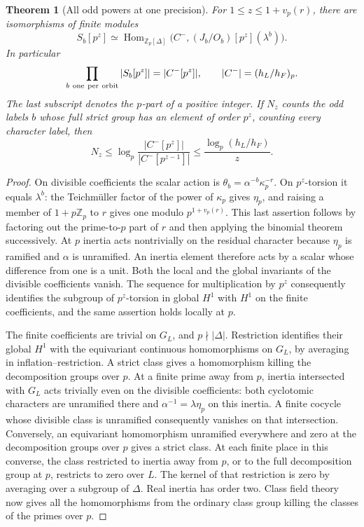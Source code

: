 \documentclass[a4paper,11pt]{article}
\newtheorem{theorem}[proposition]{Theorem}
\theoremstyle{definition}
\theoremstyle{remark}
\newcommand{\ZZ}{\mathbb Z}\newcommand{\ord}{\operatorname{ord}}
\numberwithin{equation}{section}
\begin{document}
\begin{theorem}[All odd powers at one precision]
\leavevmode\label{thm:halfclassdigits643}
For \(1\le z\le1+v_p(r)\), there are isomorphisms of finite
modules
\[
 S_b[p^z]\simeq
  \operatorname{Hom}_{\ZZ_p[\Delta]}
       \bigl(C^-,(J_b/O_b)[p^z](\lambda^b)\bigr).
\]
In particular
\[
          \prod_{b\ {\rm one\ per\ orbit}} |S_b[p^z]|
                    = |C^-[p^z]|,\qquad |C^-|=(h_L/h_F)_p .
\]
The last subscript denotes the \(p\)-part of a positive integer.
If \(N_z\) counts the odd labels \(b\) whose full strict group
has an element of order \(p^z\), counting every character label,
then
\[
        N_z\le
        \log_p\!\frac{|C^-[p^z]|}{|C^-[p^{z-1}]|}
               \le \frac{\log_p(h_L/h_F)}{z}.
\]
\end{theorem}
\begin{proof}
On divisible coefficients the scalar action is
\(\theta_b=\alpha^{-b}\kappa_p^{-r}\). On \(p^z\)-torsion it
equals \(\lambda^b\): the Teichm\"uller factor of the power of
\(\kappa_p\) gives \(\eta_p\), and raising a member of
\(1+p\ZZ_p\) to \(r\) gives one modulo \(p^{1+v_p(r)}\).
This last assertion follows by factoring out the prime-to-\(p\)
part of \(r\) and then applying the binomial theorem successively.
At \(p\) inertia acts nontrivially on the residual character
because \(\eta_p\) is ramified and \(\alpha\) is unramified.
An inertia element therefore acts by a scalar whose difference
from one is a unit. Both the local and the global invariants
of the divisible coefficients vanish. The sequence for
multiplication by \(p^z\) consequently identifies the subgroup
of \(p^z\)-torsion in global \(H^1\) with \(H^1\) on the finite
coefficients, and the same assertion holds locally at \(p\).

The finite coefficients are trivial on \(G_L\), and
\(p\nmid|\Delta|\). Restriction identifies their global \(H^1\)
with the equivariant continuous homomorphisms on \(G_L\), by
averaging in inflation--restriction. A strict class gives a
homomorphism killing the decomposition groups over \(p\).
At a finite prime away from \(p\), inertia intersected with
\(G_L\) acts trivially even on the divisible coefficients:
both cyclotomic characters are unramified there and
\(\alpha^{-1}=\lambda\eta_p\) on this inertia. A finite
cocycle whose divisible class is unramified consequently
vanishes on that intersection. Conversely, an equivariant
homomorphism unramified everywhere and zero at the
decomposition groups over \(p\) gives a strict class. At each
finite place in this converse, the class restricted to inertia
away from \(p\), or to the full decomposition group at \(p\),
restricts to zero over \(L\). The kernel of that restriction
is zero by averaging over a subgroup of \(\Delta\).
Real inertia has order two. Class field theory now gives all
the homomorphisms from the ordinary class group killing the
classes of the primes over \(p\).


\end{proof}
\end{document}
